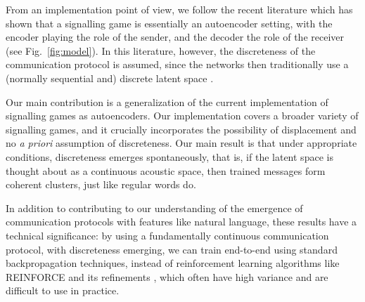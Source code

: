 \documentclass[11pt,a4paper]{article}
\begin{document}
From an implementation point of view, we follow the recent literature which has shown that a signalling game is essentially an autoencoder setting, with the encoder playing the role of the sender, and the decoder the role of the receiver (see Fig.~\ref{fig:model}). In this literature, however, the discreteness of the communication protocol is assumed, since the networks then traditionally use a (normally sequential and) discrete latent space \citep{Havrylov2017, Chaabouni2019a, Kharitonov2019}.  


Our main contribution is a generalization of the current implementation of signalling games as autoencoders.
Our implementation covers a broader variety of signalling games, and it crucially incorporates the possibility of displacement and no \emph{a priori} assumption of discreteness. %
Our main result is that under appropriate conditions, discreteness emerges spontaneously, that is, if the latent space is thought about as a continuous acoustic space, then trained messages form coherent clusters, just like regular words do.

In addition to contributing to our understanding of the emergence of communication protocols with features like natural language, these results have a technical significance: by using a fundamentally continuous communication protocol, with discreteness emerging, we can train end-to-end using standard backpropagation techniques, instead of reinforcement learning algorithms like REINFORCE and its refinements \citep{Williams1992, Schulman2015, Mnih2016}, which often have high variance and are difficult to use in practice.
\end{document}
